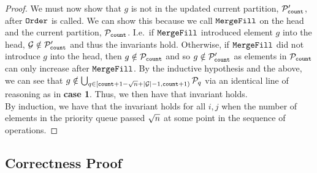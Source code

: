 \begin{proof}
We must now show that $g$ is not in the updated current partition, $\mathcal{P}'_{\texttt{count}}$, after $\texttt{Order}$ is called.
We can show this because we call $\texttt{MergeFill}$ on the head and the current partition, $\mathcal{P}_{\texttt{count}}$. I.e.\ if $\texttt{MergeFill}$ introduced element $g$
into the head, $\mathcal{G} \notin \mathcal{P}'_{\texttt{count}}$ and thus the invariants hold. Otherwise, if $\texttt{MergeFill}$ did not introduce $g$ into the head, then $g \notin \mathcal{P}_{\texttt{count}}$ and so $g \notin \mathcal{P}'_{\texttt{count}}$
as elements in $\mathcal{P}_{\texttt{count}}$ can only increase after $\texttt{MergeFill}$.
By the inductive hypothesis and the above, we can see that $g \notin \bigcup_{q \in [{\texttt{count}} + 1 - {\sqrt{n}} + |\mathcal{G}| - 1, {\texttt{count}} + 1)} \mathcal{P}_q$ via an identical line of reasoning as in \textbf{case 1}.
Thus, we then have that invariant holds.\\


By induction, we have that the invariant holds for all $i, j$ when the number of elements in the priority queue passed ${\sqrt{n}}$ at some point in the sequence of operations.
\end{proof}

\subsection{Correctness Proof}
